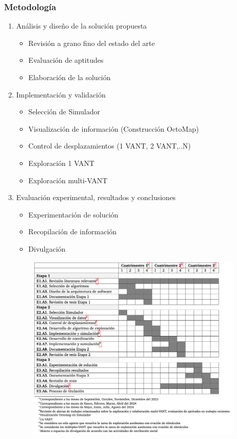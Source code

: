 \documentclass[
	11pt, %
	aspectratio=169, %
]{beamer}
\begin{document}
\begin{frame}

  \frametitle{Metodología}
  \bigskip %

  \begin{enumerate}
  \item <1-> Análisis y diseño de la solución propuesta 
    \begin{itemize}
    \item Revisión a grano fino del estado del arte
    \item Evaluación de aptitudes
    \item Elaboración de la solución
    \end{itemize}
  \item <2-> Implementación y validación
    \begin{itemize}
    \item Selección de Simulador
    \item Visualización de información (Construcción OctoMap)
    \item Control de desplazamientos (1 VANT, 2 VANT,..N)
    \item Exploración 1 VANT
    \item Exploración multi-VANT
    \end{itemize}
  \item <3-> Evaluación experimental, resultados y conclusiones
    \begin{itemize}
    \item Experimentación de solución
    \item Recopilación de información
    \item Divulgación
    \end{itemize}
  \end{enumerate}  
\end{frame}

\begin{frame}
  \begin{figure}
    \centering
    \includegraphics[width=12cm, height=9cm]{cronograma}
  \end{figure}
\end{frame}
\end{document}
